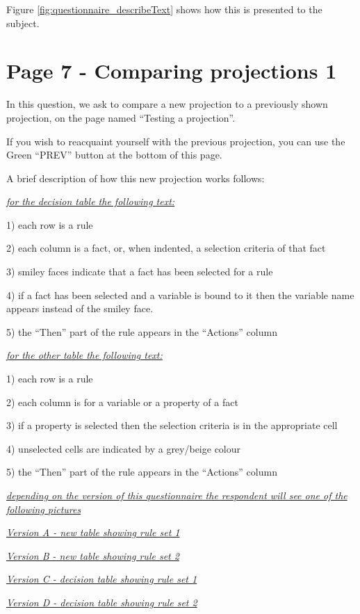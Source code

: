 Figure \ref{fig:questionnaire_describeText} shows how this is presented to the subject.

\section*{Page 7 - Comparing projections 1}

In this question, we ask to compare a new projection to a previously shown projection, on the page named ``Testing a projection''.

If you wish to reacquaint yourself with the previous projection, you can use the Green ``PREV''  button at the bottom of this page.

A brief description of how this new projection works follows:

\emph{\underline{for the decision table the following text:}}

1) each row is a rule

2) each column is a fact, or, when indented, a selection criteria of that fact

3) smiley faces indicate that a fact has been selected for a rule

4) if a fact has been selected and a variable is bound to it then the variable name appears instead of the smiley face.

5) the ``Then'' part of the rule appears in the ``Actions'' column


\emph{\underline{for the other table the following text:}}

1) each row is a rule

2) each column is for a variable or a property of a fact

3) if a property is selected then the selection criteria is in the appropriate cell

4) unselected cells are indicated by a grey/beige colour

5) the ``Then'' part of the rule appears in the ``Actions'' column

\emph{\underline{depending on the version of this questionnaire the respondent will see one of the following pictures}}

\emph{\underline{Version A - new table showing rule set 1}}

\emph{\underline{Version B - new table showing rule set 2}}

\emph{\underline{Version C - decision table showing rule set 1}}

\emph{\underline{Version D - decision table showing rule set 2}}

